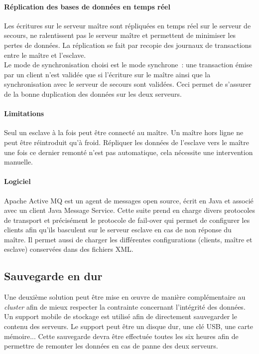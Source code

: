\paragraph{Réplication des bases de données en temps réel}
Les écritures sur le serveur maître sont répliquées en temps réel sur le serveur de secours, ne ralentissent pas le serveur maître et permettent de minimiser les pertes de données.
La réplication se fait par recopie des journaux de transactions entre le maître et l'esclave.
\\
Le mode de synchronisation choisi est le mode synchrone~: une transaction émise par un client n'est validée que si l'écriture sur le maître ainsi que la synchronisation avec le serveur de secours sont validées.
Ceci permet de s'assurer de la bonne duplication des données sur les deux serveurs. 

\paragraph{Limitations}
Seul un esclave à la fois peut être connecté au maître.
Un maître hors ligne ne peut être réintroduit qu'à froid.
Répliquer les données de l'esclave vers le maître une fois ce dernier remonté n'est pas automatique, cela nécessite une intervention manuelle.

\paragraph{Logiciel}
Apache Active MQ est un agent de messages open source, écrit en Java et associé avec un client Java Message Service.
Cette suite prend en charge divers protocoles de transport et précisément le protocole de fail-over qui permet de configurer les clients afin qu'ils basculent sur le serveur esclave en cas de non réponse du maître. 
Il permet aussi de charger les différentes configurations (clients, maître et esclave) conservées dans des fichiers XML. 

\subsection{Sauvegarde en dur}
Une deuxième solution peut être mise en œuvre de manière complémentaire au \emph{cluster} afin de mieux respecter la contrainte concernant l'intégrité des données.
Un support mobile de stockage est utilisé afin de directement sauvegarder le contenu des serveurs.
Le support peut être un disque dur, une clé USB, une carte mémoire...
Cette sauvegarde devra être effectuée toutes les six heures afin de permettre de remonter les données en cas de panne des deux serveurs.  
